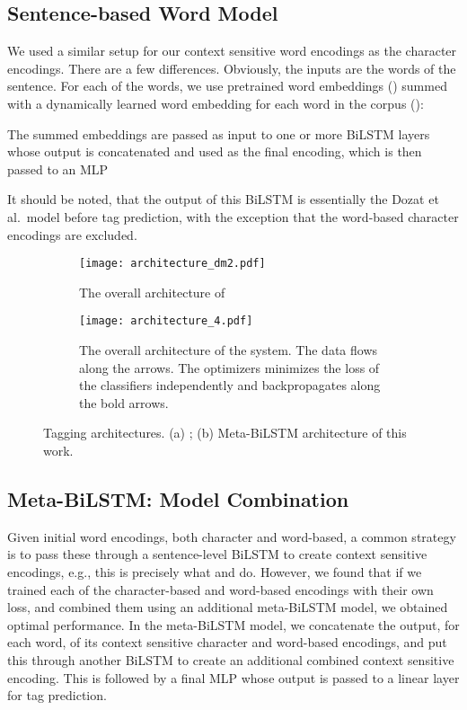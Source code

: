\documentclass[11pt,a4paper]{article}
\begin{document}
\subsection{Sentence-based Word Model}
\label{sec:word-model}

We used a similar setup for our context sensitive word encodings as the character encodings. There are a few differences. Obviously, the inputs are the words of the sentence. For each of the words, we use pretrained word embeddings () summed with a dynamically learned word embedding for each word in the corpus ():

The summed embeddings  are passed as input to one or more BiLSTM layers whose output  is concatenated and used as the final encoding, which is then passed to an MLP 


It should be noted, that the output of this BiLSTM is essentially the Dozat et al.\ model before tag prediction, with the exception that the word-based character encodings are excluded.



\begin{figure*}[t!]
\begin{subfigure}[t]{0.5\textwidth}
\centering\texttt{[image: architecture\_dm2.pdf]}
\caption{The overall architecture of }
\label{figure:architecture-dm}
\end{subfigure}
\begin{subfigure}[t]{0.5\textwidth}
\centering\texttt{[image: architecture\_4.pdf]}
\caption{The overall architecture of the system. The data flows along the arrows. The optimizers minimizes the loss of the classifiers independently and backpropagates along the bold arrows.}
\label{figure:architecture}
\end{subfigure}
\caption{Tagging architectures. (a) ; (b) Meta-BiLSTM architecture of this work.}
\end{figure*}

\subsection{Meta-BiLSTM: Model Combination}

Given initial word encodings, both character and word-based, a common strategy is to pass these through a sentence-level BiLSTM to create context sensitive encodings, e.g., this is precisely what  and  do. However, we found that if we trained each of the character-based and word-based encodings with their own loss, and combined them using an additional meta-BiLSTM model, we obtained optimal performance. In the meta-BiLSTM model, we concatenate the output, for each word, of its context sensitive character and word-based encodings, and put this through another BiLSTM to create an additional combined context sensitive encoding. This is followed by a final MLP whose output is passed to a linear layer for tag prediction. 
\end{document}
